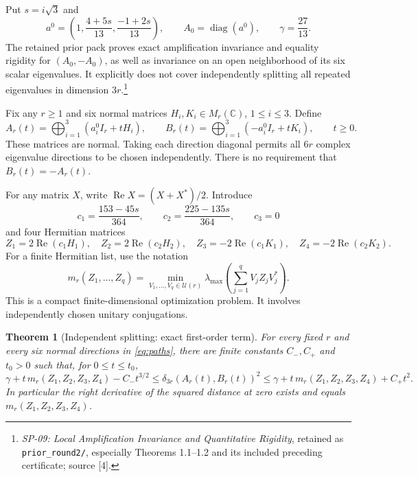 \documentclass[11pt]{article}
\newtheorem{theorem}{Theorem}[section]
\theoremstyle{remark}\newtheorem{remark}[theorem]{Remark}
\newcommand{\C}{\mathbb C}
\newcommand{\U}{\mathcal U}
\newcommand{\diag}{\operatorname{diag}}
\newcommand{\Ree}{\operatorname{Re}}
\newcommand{\dd}{\delta}
\begin{document}
Put $s=i\sqrt3$ and
\begin{equation}\label{eq:reference}
 a^0=\left(1,\frac{4+5s}{13},\frac{-1+2s}{13}\right),\qquad
 A_0=\diag(a^0),\qquad \gamma=\frac{27}{13}.
\end{equation}
The retained prior pack proves exact amplification invariance and equality rigidity for $(A_0,-A_0)$, as well as invariance on an open neighborhood of its six scalar eigenvalues. It explicitly does not cover independently splitting all repeated eigenvalues in dimension $3r$.\footnote{\emph{SP-09: Local Amplification Invariance and Quantitative Rigidity}, retained as \texttt{prior\_round2/}, especially Theorems 1.1--1.2 and its included preceding certificate; source [4].}

Fix any $r\ge1$ and six normal matrices $H_i,K_i\in M_r(\C)$, $1\le i\le3$. Define
\begin{equation}\label{eq:paths}
 A_r(t)=\bigoplus_{i=1}^3(a_i^0 I_r+tH_i),\qquad
 B_r(t)=\bigoplus_{i=1}^3(-a_i^0 I_r+tK_i),\qquad t\ge0.
\end{equation}
These matrices are normal. Taking each direction diagonal permits all $6r$ complex eigenvalue directions to be chosen independently. There is no requirement that $B_r(t)=-A_r(t)$.

For any matrix $X$, write $\Ree X=(X+X^*)/2$. Introduce
\begin{equation}\label{eq:coefficients}
 c_1=\frac{153-45s}{364},\qquad c_2=\frac{225-135s}{364},\qquad c_3=0
\end{equation}
and four Hermitian matrices
\begin{equation}\label{eq:Z}
 Z_1=2\Ree(c_1H_1),\quad Z_2=2\Ree(c_2H_2),\quad
 Z_3=-2\Ree(c_1K_1),\quad Z_4=-2\Ree(c_2K_2).
\end{equation}
For a finite Hermitian list, use the notation
\begin{equation}\label{eq:m}
 m_r(Z_1,\ldots,Z_q)=\min_{V_1,\ldots,V_q\in\U(r)}
 \lambda_{\max}\!\left(\sum_{j=1}^q V_j Z_j V_j^*\right).
\end{equation}
This is a compact finite-dimensional optimization problem. It involves independently chosen unitary conjugations.

\begin{theorem}[Independent splitting: exact first-order term]\label{thm:main}
For every fixed $r$ and every six normal directions in \eqref{eq:paths}, there are finite constants $C_-,C_+$ and $t_0>0$ such that, for $0\le t\le t_0$,
\begin{equation}\label{eq:expansion}
 \gamma+t\,m_r(Z_1,Z_2,Z_3,Z_4)-C_-t^{3/2}
 \le \dd_{3r}(A_r(t),B_r(t))^2
 \le \gamma+t\,m_r(Z_1,Z_2,Z_3,Z_4)+C_+t^2.
\end{equation}
In particular the right derivative of the squared distance at zero exists and equals $m_r(Z_1,Z_2,Z_3,Z_4)$.
\end{theorem}
\end{document}
